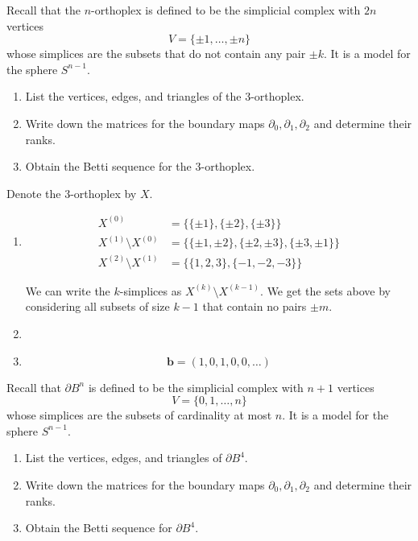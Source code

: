 \documentclass[12 pt, letterpaper]{hmcpset}
\begin{document}
\begin{problem}[59.]
	Recall that the $n$-orthoplex is defined to be the simplicial complex with $2n$ vertices
	\[
		V = \{ \pm 1, \dots, \pm n \}
	\]
	whose simplices are the subsets that do not contain any pair $\pm k$. It is a model for the sphere $S^{n - 1}$.

	\begin{enumerate}
		\item List the vertices, edges, and triangles of the $3$-orthoplex.

		\item Write down the matrices for the boundary maps $\partial_{0}, \partial_{1}, \partial_{2}$ and determine their ranks.

		\item Obtain the Betti sequence for the $3$-orthoplex.
	\end{enumerate}
\end{problem}

\begin{solution}
	Denote the $3$-orthoplex by $X$.
	\begin{enumerate}
		\item
			\[
				\boxed{
					\begin{split}
						X^{(0)} & = \{ \{ \pm 1 \}, \{ \pm 2 \}, \{ \pm 3 \} \} \\
						X^{(1)} \setminus X^{(0)} & = \{ \{ \pm 1, \pm 2 \}, \{ \pm 2, \pm 3 \}, \{ \pm 3, \pm 1 \} \} \\
						X^{(2)} \setminus X^{(1)} & = \{ \{ 1, 2, 3 \}, \{ -1, -2, -3 \} \}
					\end{split}
				}
			\]

			We can write the $k$-simplices as $X^{(k)} \setminus X^{(k - 1)}$. We get the sets above by considering all subsets of size $k - 1$ that contain no pairs $\pm m$.

		\item

		\item
			\[
				\boxed{
					\mathbf{b} = (1, 0, 1, 0, 0, \dots)
				}
			\]
	\end{enumerate}
\end{solution}

\pagebreak

\begin{problem}[60.]
	Recall that $\partial B^{n}$ is defined to be the simplicial complex with $n + 1$ vertices
	\[
		V = \{ 0, 1, \dots, n \}
	\]
	whose simplices are the subsets of cardinality at most $n$. It is a model for the sphere $S^{n - 1}$.

	\begin{enumerate}
		\item List the vertices, edges, and triangles of $\partial B^{4}$.

		\item Write down the matrices for the boundary maps $\partial_{0}, \partial_{1}, \partial_{2}$ and determine their ranks.

		\item Obtain the Betti sequence for $\partial B^{4}$.
	\end{enumerate}
\end{problem}
\end{document}
